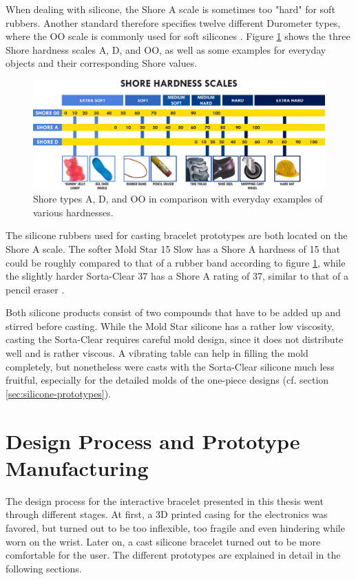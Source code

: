 When dealing with silicone, the Shore A scale is sometimes too "hard" for soft rubbers. Another standard therefore specifies twelve different Durometer types, where the OO scale is commonly used for soft silicones \cite{ISO7619}. Figure \ref{fig:shore} shows the three Shore hardness scales A, D, and OO, as well as some examples for everyday objects and their corresponding Shore values.

\begin{figure}[bth]
	\includegraphics[width=\linewidth]{gfx/durometer_without_logo.pdf}
	\caption[Shore hardness scales and everyday examples]{Shore types A, D, and OO in comparison with everyday examples of various hardnesses. \cite{smoothon-web}}\label{fig:shore}
\end{figure}

The silicone rubbers used for casting bracelet prototypes are both located on the Shore A scale. The softer Mold Star 15 Slow has a Shore A hardness of 15 that could be roughly compared to that of a rubber band according to figure \ref{fig:shore}, while the slightly harder Sorta-Clear 37 has a Shore A rating of 37, similar to that of a pencil eraser \cite{moldstar} \cite{sortaclear}.

Both silicone products consist of two compounds that have to be added up and stirred before casting. While the Mold Star silicone has a rather low viscosity, casting the Sorta-Clear requires careful mold design, since it does not distribute well and is rather viscous. A vibrating table can help in filling the mold completely, but nonetheless were casts with the Sorta-Clear silicone much less fruitful, especially for the detailed molds of the one-piece designs (cf. section \ref{sec:silicone-prototypes}).

\section{Design Process and Prototype Manufacturing}

The design process for the interactive bracelet presented in this thesis went through different stages. At first, a 3D printed casing for the electronics was favored, but turned out to be too inflexible, too fragile and even hindering while worn on the wrist. Later on, a cast silicone bracelet turned out to be more comfortable for the user. The different prototypes are explained in detail in the following sections.

